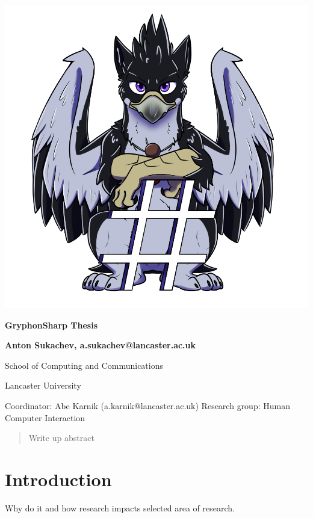 \documentclass{article}
\begin{document}
\begin{titlepage}

    \center

    \includegraphics[scale=0.5]{AzuGryphonSharp.png} %

    \huge  \textbf{GryphonSharp Thesis}

    \vspace{2cm}

    \Large \textbf{Anton Sukachev, a.sukachev@lancaster.ac.uk}

    School of Computing and Communications

    Lancaster University

    \vfill

    Coordinator: Abe Karnik (a.karnik@lancaster.ac.uk)\endgraf
    Research group: Human Computer Interaction

\end{titlepage}
\pagebreak

\begin{abstract}
    Write up abstract
\end{abstract}

\section{Introduction}
Why do it and how research impacts selected area of research.
\end{document}
